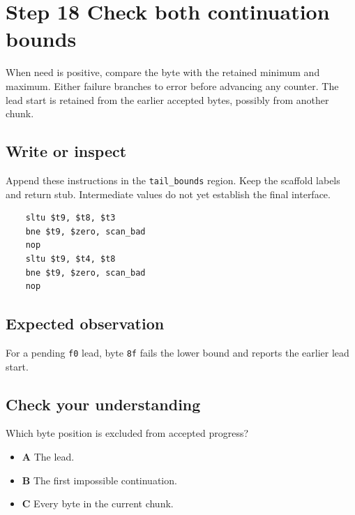 \section{Step 18 Check both continuation bounds}\label{utf8-s18}

When need is positive, compare the byte with the retained minimum and maximum. Either failure branches to error before advancing any counter. The lead start is retained from the earlier accepted bytes, possibly from another chunk.

\subsection{Write or inspect}
Append these instructions in the \texttt{tail\_bounds} region. Keep the scaffold labels and return stub. Intermediate values do not yet establish the final interface.

\begin{verbatim}
    sltu $t9, $t8, $t3
    bne $t9, $zero, scan_bad
    nop
    sltu $t9, $t4, $t8
    bne $t9, $zero, scan_bad
    nop
\end{verbatim}

\subsection{Expected observation}
For a pending \texttt{f0} lead, byte \texttt{8f} fails the lower bound and reports the earlier lead start.

\subsection{Check your understanding}
Which byte position is excluded from accepted progress?

\begin{itemize}
  \item \textbf{A} The lead.
  \item \textbf{B} The first impossible continuation.
  \item \textbf{C} Every byte in the current chunk.
\end{itemize}

